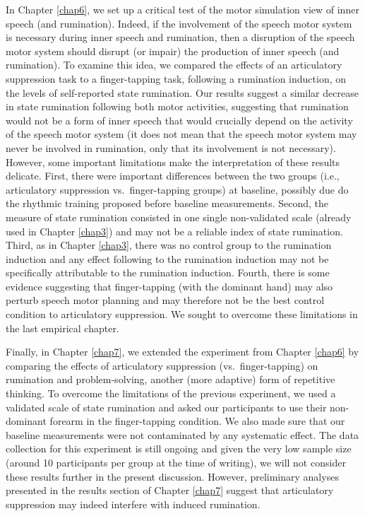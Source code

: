 \documentclass[a4paper,12pt,twoside,onecolumn,openright,final,oldfontcommands]{memoir}
\begin{document}
In Chapter \ref{chap6}, we set up a critical test of the motor simulation view of inner speech (and rumination). Indeed, if the involvement of the speech motor system is necessary during inner speech and rumination, then a disruption of the speech motor system should disrupt (or impair) the production of inner speech (and rumination). To examine this idea, we compared the effects of an articulatory suppression task to a finger-tapping task, following a rumination induction, on the levels of self-reported state rumination. Our results suggest a similar decrease in state rumination following both motor activities, suggesting that rumination would not be a form of inner speech that would crucially depend on the activity of the speech motor system (it does not mean that the speech motor system may never be involved in rumination, only that its involvement is not necessary). However, some important limitations make the interpretation of these results delicate. First, there were important differences between the two groups (i.e., articulatory suppression vs.~finger-tapping groups) at baseline, possibly due do the rhythmic training proposed before baseline measurements. Second, the measure of state rumination consisted in one single non-validated scale (already used in Chapter \ref{chap3}) and may not be a reliable index of state rumination. Third, as in Chapter \ref{chap3}, there was no control group to the rumination induction and any effect following to the rumination induction may not be specifically attributable to the rumination induction. Fourth, there is some evidence suggesting that finger-tapping (with the dominant hand) may also perturb speech motor planning and may therefore not be the best control condition to articulatory suppression. We sought to overcome these limitations in the last empirical chapter.

Finally, in Chapter \ref{chap7}, we extended the experiment from Chapter \ref{chap6} by comparing the effects of articulatory suppression (vs.~finger-tapping) on rumination and problem-solving, another (more adaptive) form of repetitive thinking. To overcome the limitations of the previous experiment, we used a validated scale of state rumination and asked our participants to use their non-dominant forearm in the finger-tapping condition. We also made sure that our baseline measurements were not contaminated by any systematic effect. The data collection for this experiment is still ongoing and given the very low sample size (around 10 participants per group at the time of writing), we will not consider these results further in the present discussion. However, preliminary analyses presented in the results section of Chapter \ref{chap7} suggest that articulatory suppression may indeed interfere with induced rumination.
\end{document}
